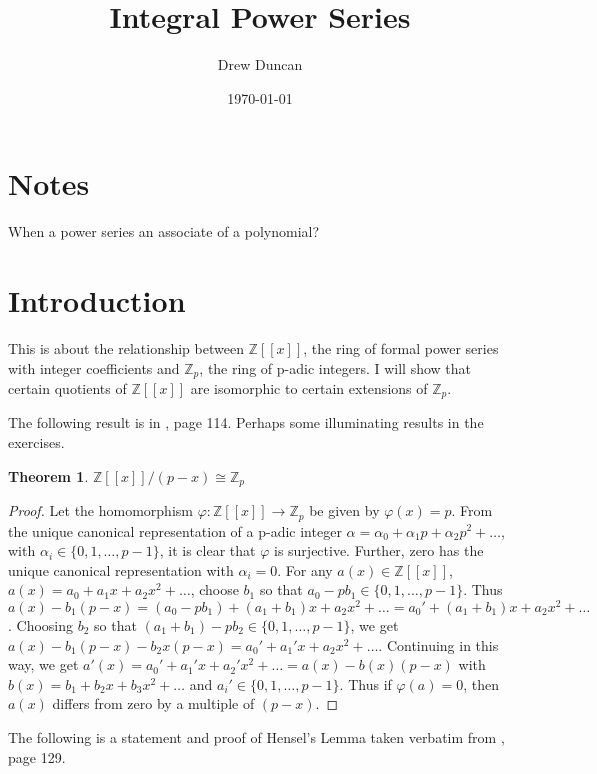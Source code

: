 \documentclass{article}
\title{Integral Power Series}
\author{Drew Duncan}
\date{\today}
\newtheorem{theorem}{Theorem}
\begin{document}
\maketitle

\section{Notes}
When a power series an associate of a polynomial?

\section{Introduction}

This is about the relationship between $\mathbb{Z}[[x]]$, the ring of formal power series with integer coefficients and $\mathbb{Z}_p$, the ring of p-adic integers.  I will show that certain quotients of $\mathbb{Z}[[x]]$ are isomorphic to certain extensions of $\mathbb{Z}_p$.

The following result is in \cite{MR1697859}, page 114.  Perhaps some illuminating results in the exercises.

\begin{theorem}\label{Z_p}
$\mathbb{Z}[[x]]/(p-x) \cong \mathbb{Z}_p$
\end{theorem}
\begin{proof}
Let the homomorphism $\varphi : \mathbb{Z}[[x]] \rightarrow \mathbb{Z}_p$ be given by $\varphi(x) = p$.  From the unique canonical representation of a p-adic integer $\alpha = \alpha_0 + \alpha_1 p  + \alpha_2 p^2 + \ldots$, with $\alpha_i \in \{0, 1, \ldots, p-1\}$, it is clear that $\varphi$ is surjective.  Further, zero has the unique canonical  representation with $\alpha_i = 0$.  For any $a(x) \in \mathbb{Z}[[x]]$, $a(x) = a_0 + a_1 x + a_2 x^2 + \ldots$, choose $b_1$ so that $a_0 - pb_1 \in \{0, 1, \ldots, p-1\}$.  Thus $a(x) - b_1(p-x) = (a_0 - pb_1) + (a_1 + b_1)x + a_2 x^2 + \ldots = a_0' + (a_1 + b_1)x + a_2 x^2 + \ldots$.  Choosing $b_2$ so that $(a_1 + b_1) - pb_2 \in \{0, 1, \ldots, p-1\}$, we get $a(x) - b_1(p-x) - b_2x(p-x) = a_0' + a_1'x + a_2 x^2 + \ldots$.  Continuing in this way, we get $a'(x)= a_0' + a_1'x + a_2' x^2 + \ldots = a(x) - b(x)(p-x)$ with $b(x) = b_1 + b_2x + b_3x^2 + \ldots$ and $a_i' \in \{0,1,\ldots,p-1\}$.  Thus if $\varphi(a) = 0$, then $a(x)$ differs from zero by a multiple of $(p-x)$.
\end{proof}

The following is a statement and proof of Hensel's Lemma taken verbatim from \cite{MR1697859}, page 129.
\end{document}

